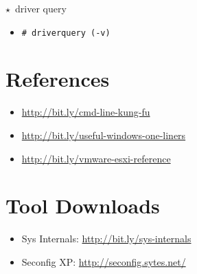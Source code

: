 \documentclass[10pt,landscape]{article}
\newcommand{\os}[1]{\texttt{\footnotesize{#1}}}
\newcommand{\windows}{\os{W}}
\newenvironment{action}[1]
  {\begin{minipage}[c]{\linewidth}$\star$~#1\begin{itemize}[leftmargin=1cm]}
  {\end{itemize}\end{minipage}\vspace*{3pt}}
\newcommand{\cmd}[2]{\item[#1] {\small\tt\# #2}}
\begin{document}
\begin{multicols*}{3}
\begin{action}{driver query}
\cmd{\windows}{driverquery (-v)}
\end{action}

\section*{References}

\begin{itemize}
\small
\item \url{http://bit.ly/cmd-line-kung-fu}
\item \url{http://bit.ly/useful-windows-one-liners}
\item \url{http://bit.ly/vmware-esxi-reference}
\end{itemize}

\section*{Tool Downloads}

\begin{itemize}
\small
\item Sys Internals: \url{http://bit.ly/sys-internals}
\item Seconfig XP: \url{http://seconfig.sytes.net/}
\end{itemize}

\end{multicols*}
\end{document}
